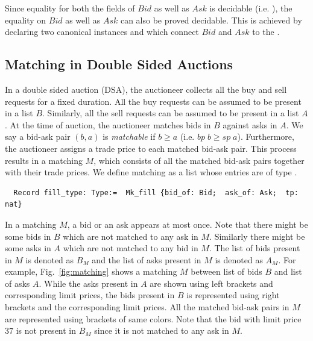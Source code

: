 \documentclass[a4paper,UKenglish,cleveref, autoref]{lipics-v2019}
\begin{document}
Since equality for both the fields of $Bid$ as well as $Ask$ is decidable (i.e. ), the equality on $Bid$ as well as $Ask$ can also be proved decidable. This is achieved by declaring two canonical instances  and  which connect $Bid$ and $Ask$ to the .  

\subsection{Matching in Double Sided Auctions}
In a double sided auction (DSA), the auctioneer collects all the buy and sell requests for a fixed duration. All the buy requests can be assumed to be present in a list $B$. Similarly, all the sell requests can be assumed to be present in a list $A$. At the time of auction, the auctioneer matches bids in $B$ against asks in $A$. We say a bid-ask pair $(b, a)$ is \emph{matchable} if $b \ge a$ (i.e. $bp \; b \ge sp \; a$).  Furthermore, the auctioneer assigns a trade price to each matched bid-ask pair. This  process results in  a matching $M$, which consists of all the matched bid-ask pairs together with their trade prices. We define matching as a list whose entries are of type .
\begin{verbatim}
  Record fill_type: Type:=  Mk_fill {bid_of: Bid;  ask_of: Ask;  tp: nat} 
\end{verbatim}

In a matching $M$, a bid or an ask appears at most once. Note that there might be some bids in $B$ which are not matched to any ask in $M$. Similarly there might be some asks in $A$ which are not matched to any bid in $M$. The list of bids present in $M$ is denoted as $B_{M}$ and the list of asks present in $M$ is denoted as $A_M$. For example, Fig.~\ref{fig:matching} shows a matching $M$ between list of bids $B$ and list of asks $A$.  While the asks present in $A$ are shown using left brackets and corresponding limit prices, the bids present in $B$ is represented using right brackets and the corresponding limit prices.  All the matched bid-ask pairs in $M$ are  represented using  brackets of same colors. Note that the bid with limit price $37$ is not present in $B_M$ since it is not matched to any ask in $M$.  
\end{document}
